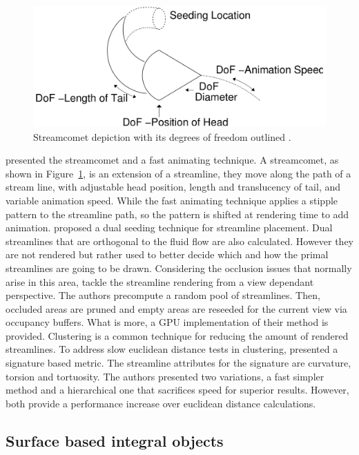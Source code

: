 \begin{figure}[htbp]
	\centering
	\includegraphics[scale=.2]{images/streamComet}
	\caption{Streamcomet depiction with its degrees of freedom outlined \cite{Laramee2005}.}
	\label{fig:streamComent}
\end{figure}

\cite{Laramee2005} presented the streamcomet and a fast animating technique.
A streamcomet, as shown in Figure~\ref{fig:streamComent}, is an extension of a streamline, they move along the path of a stream line, with adjustable head position, length and translucency of tail, and variable animation speed.
While the fast animating technique applies a stipple pattern to the streamline path, so the pattern is shifted at rendering time to add animation.
\cite{Rosanwo2009} proposed a dual seeding technique for streamline placement.
Dual streamlines that are orthogonal to the fluid flow are also calculated.
However they are not rendered but rather used to better decide which and how the primal streamlines are going to be drawn.
Considering the occlusion issues that normally arise in this area, \cite{Marchesin2010} tackle the streamline rendering from a view dependant perspective.
The authors precompute a random pool of streamlines.
Then, occluded areas are pruned and empty areas are reseeded for the current view via occupancy buffers.
What is more, a GPU implementation of their method is provided.
Clustering is a common technique for reducing the amount of rendered streamlines.
To address slow euclidean distance tests in clustering, \cite{McLoughlin2013} presented a signature based metric.
The streamline attributes for the signature are curvature, torsion and tortuosity.
The authors presented two variations, a fast simpler method and a hierarchical one that sacrifices speed for superior results.
However, both provide a performance increase over euclidean distance calculations.

\subsection{Surface based integral objects}


